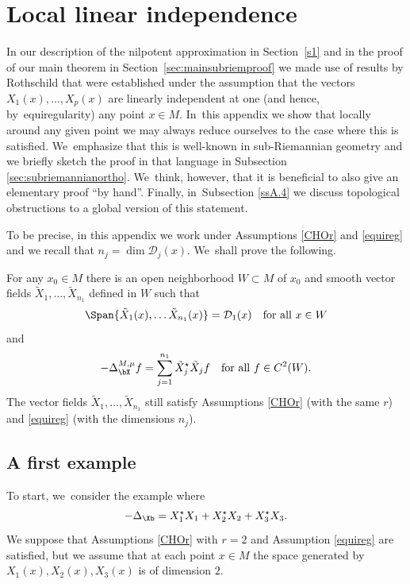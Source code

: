\section{Local linear independence}\label{AppA2}

In our description of the nilpotent approximation in Section~\ref{s1} and in the proof of our main theorem in Section~\ref{sec:mainsubriemproof} we made use of results by Rothschild \cite{Rot} that were established under the assumption that the vectors $X_1(x),\ldots,X_p(x)$ are linearly independent at one (and hence, by~equiregularity) any point $x\in M$. In~this appendix we show that locally around any given point we may always reduce ourselves to the case where this is satisfied. We~emphasize that this is well-known in sub-Riemannian geometry and we briefly sketch the proof in that language in Subsection \ref{sec:subriemannianortho}. We~think, however, that it is beneficial to also give an elementary proof ``by hand''. Finally, in~Subsection \ref{ssA.4} we discuss topological obstructions to a global version of this statement.

To be precise, in this appendix we work under Assumptions \ref{CHOr} and \ref{equireg} and we recall that $n_j=\dim\mathcal D_j(x)$. We~shall prove the following.

\begin{lemma}\label{locindep}
For any $x_0\in M$ there is an open neighborhood $W\subset M$ of $x_0$ and smooth vector fields $\tilde X_1,\ldots,\tilde X_{n_1}$ defined in $W$ such that
\begin{equation}
\label{eq:loclinindepapp}
\Span\{ \tilde X_1(x),\ldots \tilde X_{n_1}(x) \} = \mathcal D_1(x)
\quad\text{for all}\ x\in W
\end{equation}
and
\[
-\Delta_\bX^{M,\mu} f = \sum_{j=1}^{n_1} \tilde X_j^\star \tilde X_j f
\quad\text{for all} \ f\in C^2(W).
\]
The vector fields $\tilde X_1,\ldots,\tilde X_{n_1}$ still satisfy Assumptions \ref{CHOr} (with the same $r$) and \ref{equireg} (with the dimensions $n_j$).
\end{lemma}

\subsection{A first example}
To start, we~consider the example where
\[
-\Delta_\Xb = X_1^\star X_1 + X_2^\star X_2 + X_3^\star X_3.
\]
We suppose that Assumptions \ref{CHOr} with $r=2$ and Assumption \ref{equireg} are satisfied, but we assume that at each point $x\in M$ the space generated by $X_1(x), X_2(x), X_3(x)$ is of dimension $2$.

